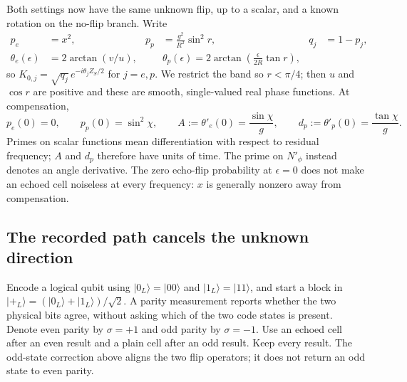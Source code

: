\documentclass[11pt,a4paper]{article}
\numberwithin{equation}{section}
\theoremstyle{remark}
\begin{document}
Both settings now have the same unknown flip, up to a scalar, and a known
rotation on the no-flip branch. Write
\begin{align}
 p_e&=x^2,&p_p&=\frac{g^2}{R^2}\sin^2r,&q_j&=1-p_j,\nonumber\\
 \theta_e(\epsilon)&=2\arctan(v/u),&&
 \theta_p(\epsilon)=2\arctan\!\left(\frac\epsilon{2R}\tan r\right),
 \label{con:phases}
\end{align}
so $K_{0,j}=\sqrt{q_j}\,e^{-i\theta_jZ_S/2}$ for $j=e,p$.
We restrict the band so $r<\pi/4$; then $u$ and $\cos r$ are positive and
these are smooth, single-valued real phase functions. At compensation,
\begin{equation}
 p_e(0)=0,\qquad p_p(0)=\sin^2\chi,\qquad
 A:=\theta'_e(0)=\frac{\sin\chi}{g},\qquad
 d_p:=\theta'_p(0)=\frac{\tan\chi}{g}.
 \label{con:derivatives}
\end{equation}
Primes on scalar functions mean differentiation with respect to residual
frequency; $A$ and $d_p$ therefore have units of time.
The prime on $N'_\phi$ instead denotes an angle derivative.
The zero echo-flip probability
at $\epsilon=0$ does not make an echoed cell noiseless at every frequency:
$x$ is generally nonzero away from compensation.

\subsection{The recorded path cancels the unknown direction}

Encode a logical qubit using $|0_L\rangle=|00\rangle$ and
$|1_L\rangle=|11\rangle$, and start a block in
$|+_L\rangle=(|0_L\rangle+|1_L\rangle)/\sqrt2$.
A parity measurement reports whether the two physical bits agree, without
asking which of the two code states is present. Denote even parity by
$\sigma=+1$ and odd parity by $\sigma=-1$. Use an echoed cell after an
even result and a plain cell after an odd result. Keep every result.
The odd-state correction above aligns the two flip operators; it does
not return an odd state to even parity.
\end{document}
